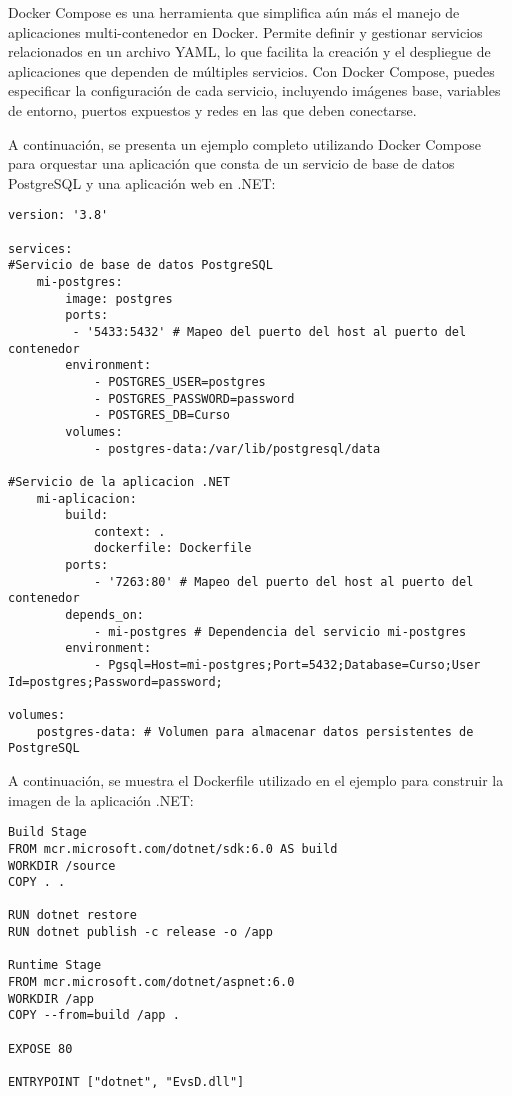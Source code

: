 \documentclass{article}
\begin{document}
Docker Compose es una herramienta que simplifica aún más el manejo de aplicaciones multi-contenedor en Docker. Permite definir y gestionar servicios relacionados en un archivo YAML, lo que facilita la creación y el despliegue de aplicaciones que dependen de múltiples servicios. Con Docker Compose, puedes especificar la configuración de cada servicio, incluyendo imágenes base, variables de entorno, puertos expuestos y redes en las que deben conectarse.

A continuación, se presenta un ejemplo completo utilizando Docker Compose para orquestar una aplicación que consta de un servicio de base de datos PostgreSQL y una aplicación web en .NET:

\begin{lstlisting}
version: '3.8'

services:
#Servicio de base de datos PostgreSQL
    mi-postgres:
        image: postgres
        ports:
         - '5433:5432' # Mapeo del puerto del host al puerto del contenedor
        environment:
            - POSTGRES_USER=postgres
            - POSTGRES_PASSWORD=password
            - POSTGRES_DB=Curso
        volumes:
            - postgres-data:/var/lib/postgresql/data

#Servicio de la aplicacion .NET
    mi-aplicacion:
        build:
            context: .
            dockerfile: Dockerfile
        ports:
            - '7263:80' # Mapeo del puerto del host al puerto del contenedor
        depends_on:
            - mi-postgres # Dependencia del servicio mi-postgres
        environment:
            - Pgsql=Host=mi-postgres;Port=5432;Database=Curso;User Id=postgres;Password=password;

volumes:
    postgres-data: # Volumen para almacenar datos persistentes de PostgreSQL
\end{lstlisting}

A continuación, se muestra el Dockerfile utilizado en el ejemplo para construir la imagen de la aplicación .NET:

\begin{lstlisting}
Build Stage
FROM mcr.microsoft.com/dotnet/sdk:6.0 AS build
WORKDIR /source
COPY . .

RUN dotnet restore
RUN dotnet publish -c release -o /app

Runtime Stage
FROM mcr.microsoft.com/dotnet/aspnet:6.0
WORKDIR /app
COPY --from=build /app .

EXPOSE 80

ENTRYPOINT ["dotnet", "EvsD.dll"]
\end{lstlisting}
\end{document}
